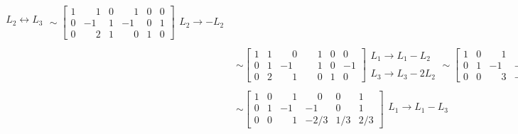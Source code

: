 \begin{exemplo}
\begin{solucao}
\begin{align*}
\begin{array}{l}
			    	L_2 \leftrightarrow L_3\\
				\end{array} \sim
				\left[
					\begin{array}{ccc|ccc}
						1 & \phantom{-}1 & 0 & \phantom{-}1 & 0 & 0 \\
						0 & -1 & 1 & -1 & 0 & 1\\
						0 & \phantom{-}2 & 1 & \phantom{-}0 & 1 & 0
					\end{array}
				\right]
				\begin{array}{l}
					\\
			    	L_2 \to -L_2\\
				\end{array}\\ \\ &\sim
				\left[
					\begin{array}{ccc|ccc}
						1 & 1 & \phantom{-}0 & \phantom{-}1 & 0 & 0 \\
						0 & 1 & -1 & \phantom{-}1 & 0 & -1\\
						0 & 2 & \phantom{-}1 & \phantom{-}0 & 1 & 0
					\end{array}
				\right]
				\begin{array}{l}
					L_1 \to L_1 - L_2\\
			    	\\
			    	L_3 \to L_3 -2L_2
				\end{array} \sim
				\left[
					\begin{array}{ccc|ccc}
						1 & 0 & \phantom{-}1 & \phantom{-}0 & 0 & 1 \\
						0 & 1 & -1 & -1 & 0 & 1\\
						0 & 0 & \phantom{-}3 & -2 & 1 & 2
					\end{array}
				\right]
				\begin{array}{l}
					\\
		    		\\
		    		L_3 \to \dfrac{1}{3}L_3
				\end{array}\\ \\ &\sim
				\left[
					\begin{array}{ccc|ccc}
						1 & 0 & \phantom{-}1 & \phantom{-}0 & 0 & 1 \\
						0 & 1 & -1 & -1 & 0 & 1\\
						0 & 0 & \phantom{-}1 & -2/3 & 1/3 & 2/3
					\end{array}
				\right]
				\begin{array}{l}
					L_1 \to L_1 - L_3\\

\end{array}
\end{align*}
\end{solucao}
\end{exemplo}
